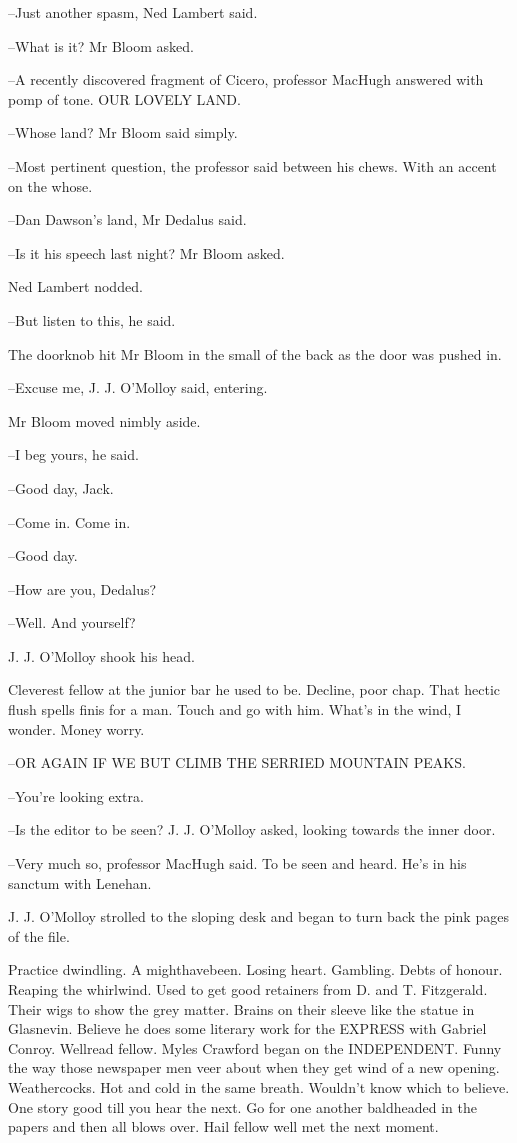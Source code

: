 --Just another spasm,
Ned Lambert said.

--What is it?
Mr Bloom asked.

--A recently discovered fragment of Cicero,
professor MacHugh answered
with pomp of tone.
OUR LOVELY LAND.



--Whose land?
Mr Bloom said simply.

--Most pertinent question,
the professor said between his chews.
With an accent on the whose.

--Dan Dawson's land,
Mr Dedalus said.

--Is it his speech last night?
Mr Bloom asked.

Ned Lambert nodded.

--But listen to this,
he said.

The doorknob hit Mr Bloom in the small of the back
as the door was pushed in.

--Excuse me,
J. J. O'Molloy said,
entering.

Mr Bloom moved nimbly aside.

--I beg yours,
he said.

--Good day,
Jack.

--Come in.
Come in.

--Good day.

--How are you, Dedalus?

--Well. And yourself?

J. J. O'Molloy shook his head.



Cleverest fellow at the junior bar he used to be. Decline, poor chap.
That hectic flush spells finis for a man. Touch and go with him. What's in
the wind, I wonder. Money worry.

--OR AGAIN IF WE BUT CLIMB THE SERRIED MOUNTAIN PEAKS.

--You're looking extra.

--Is the editor to be seen? J. J. O'Molloy asked, looking towards the
inner door.

--Very much so, professor MacHugh said. To be seen and heard. He's in
his sanctum with Lenehan.

J. J. O'Molloy strolled to the sloping desk and began to turn back the
pink pages of the file.

Practice dwindling. A mighthavebeen. Losing heart. Gambling. Debts
of honour. Reaping the whirlwind. Used to get good retainers from D. and
T. Fitzgerald. Their wigs to show the grey matter. Brains on their sleeve
like the statue in Glasnevin. Believe he does some literary work for the
EXPRESS with Gabriel Conroy. Wellread fellow. Myles Crawford began on
the INDEPENDENT. Funny the way those newspaper men veer about when
they get wind of a new opening. Weathercocks. Hot and cold in the same
breath. Wouldn't know which to believe. One story good till you hear the
next. Go for one another baldheaded in the papers and then all blows over.
Hail fellow well met the next moment.

